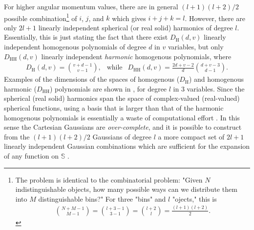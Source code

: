 \documentclass[../../master.tex]{subfiles}
\begin{document}
For higher angular momentum values, there are in general $(l+1)(l+2)/2$ possible combination\footnote{The problem is identical to the combinatorial problem: "Given $N$ indistinguishable objects, how many possible ways can we distribute them into $M$ distinguishable bins?" For three "bins" and $l$ "ojects," this is \begin{align}
{N+M-1\choose M-1}={l+3-1\choose3-1}={l+2\choose l}=\frac{(l+1)(l+2)}{2}.
\end{align} } of $i$, $j$, and $k$ which gives $i+j+k=l$. However, there are only $2l+1$ linearly independent spherical (or real solid) harmonics of degree $l$. Essentially, this is just stating the fact that there exist $D_\text{H}(d,v)$ linearly independent homogenous polynomials of degree $d$ in $v$ variables, but only $D_\text{HH}(d,v)$ linearly independent \emph{harmonic} homogenous polynomials, where \cite{hochstadt}
\begin{align}
D_\text{H}(d,v) = {v+d-1 \choose v-1}, \ \ \text{ while } \ \  D_\text{HH}(d,v) = \frac{2d+v-2}{d}{d+v-3 \choose d-1}.
\end{align}
Examples of the dimensions of the spaces of homogenous ($D_\text{H}$) and homogenous harmonic ($D_\text{HH}$) polynomials are shown in , for degree $l$ in $3$ variables. Since the spherical (real solid) harmonics span the space of complex-valued (real-valued) spherical functions, using a basis that is larger than that of the harmonic homogenous polynomials is essentially a waste of computational effort \cite{atkinson}. In this sense the Cartesian Gaussians are \emph{over-complete}, and it is possible to construct from the $(l+1)(l+2)/2$ Gaussians of degree $l$ a more compact set of $2l+1$ linearly independent Gaussian combinations which are sufficient for the expansion of any function on $\mathbb{S}$ \cite{helgaker}. 
\end{document}
